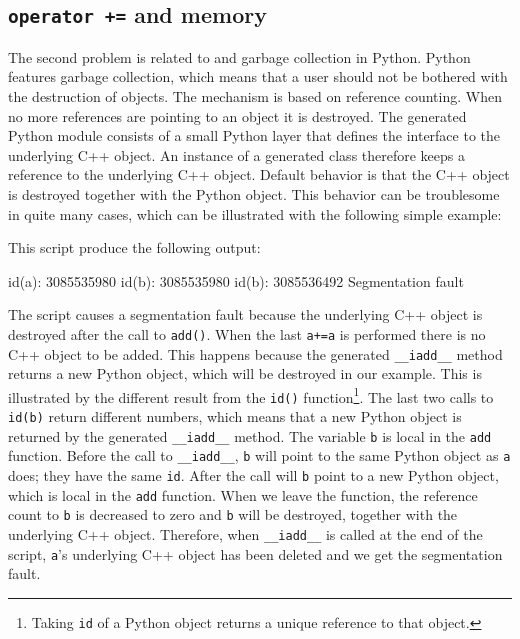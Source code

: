\subsection{\texttt{operator +=} and memory}
The second problem is related to \swig and garbage collection in Python. Python features garbage collection, which means that a user should not be bothered with the destruction of objects. The mechanism is based on reference counting. When no more references are pointing to an object it is destroyed. The \swig generated Python module consists of a small Python layer that defines the interface to the underlying C++ object. An instance of a \swig generated class therefore keeps a reference to the underlying C++ object. Default behavior is that the C++ object is destroyed together with the Python object. This behavior can be troublesome in quite many cases, which can be illustrated with the following simple example:

This script produce the following output:
\begin{python}
id(a): 3085535980
id(b): 3085535980
id(b): 3085536492
Segmentation fault
\end{python}
The script causes a segmentation fault because the underlying C++ object is destroyed after the call to \texttt{add()}. When the last \texttt{a+=a} is performed there is no C++ object to be added. This happens because the \swig generated \texttt{\_\_iadd\_\_} method returns a new Python object, which will be destroyed in our example. This is illustrated by the different result from the \texttt{id()} function\footnote{Taking \texttt{id} of a Python object returns a unique reference to that object.}. The last two calls to \texttt{id(b)} return different numbers, which means that a new Python object is returned by the \swig generated \texttt{\_\_iadd\_\_} method. The variable \texttt{b} is local in the \texttt{add} function. Before the call to \texttt{\_\_iadd\_\_}, \texttt{b} will point to the same Python object as \texttt{a} does; they have the same \texttt{id}. After the call will \texttt{b} point to a new Python object, which is local in the \texttt{add} function. When we leave the function, the reference count to \texttt{b} is decreased to zero and \texttt{b} will be destroyed, together with the underlying C++ object. Therefore, when \texttt{\_\_iadd\_\_} is called at the end of the script, \texttt{a}'s underlying C++ object has been deleted and we get the segmentation fault.\par

